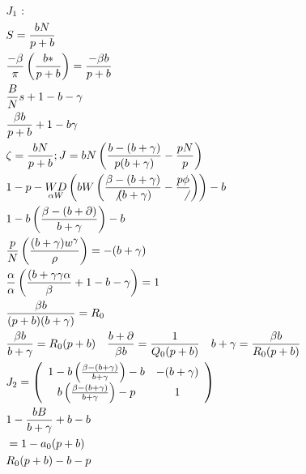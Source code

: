 \documentclass[10pt]{article}
\begin{document}
$$
\begin{aligned}
& J_{1} \text { : } \\
& S=\frac{b N}{p+b} \\
& \frac{-\beta}{\pi}\left(\frac{b *}{p+b}\right)=\frac{-\beta b}{p+b} \\
& \frac{B}{N} s+1-b-\gamma \\
& \frac{\beta b}{p+b}+1-b \gamma \\
& \zeta=\frac{b N}{p+b} ; J=b N\left(\frac{b-(b+\gamma)}{p(b+\gamma)}-\frac{p N}{p}\right) \\
& 1-p-\underset{\alpha W}{W D}\left(b W\left(\frac{\beta-(b+\gamma)}{\not(b+\gamma)}-\frac{p \phi}{\not}\right)\right)-b \\
& 1-b\left(\frac{\beta-(b+\partial)}{b+\gamma}\right)-b \\
& \frac{p}{N}\left(\frac{(b+\gamma) w^{\gamma}}{\rho}\right)=-(b+\gamma) \\
& \frac{\alpha}{\alpha}\left(\frac{(b+\gamma \gamma \alpha}{\beta}+1-b-\gamma\right)=1 \\
& \frac{\beta b}{(p+b)(b+\gamma)}=R_{0} \\
& \frac{\beta b}{b+\gamma}=R_{0}(p+b) \quad \frac{b+\partial}{\beta b}=\frac{1}{Q_{0}(p+b)} \quad b+\gamma=\frac{\beta b}{R_{0}(p+b)} \\
& J_{2}=\left(\begin{array}{cc}
1-b\left(\frac{\beta-(b+\gamma)}{b+\gamma}\right)-b & -(b+\gamma) \\
b\left(\frac{\beta-(b+\gamma)}{b+\gamma}\right)-p & 1
\end{array}\right) \\
& 1-\frac{b B}{b+\gamma}+b-b \\
& =1-a_{0}(p+b) \\
& R_{0}(p+b)-b-p
\end{aligned}
$$
\end{document}
